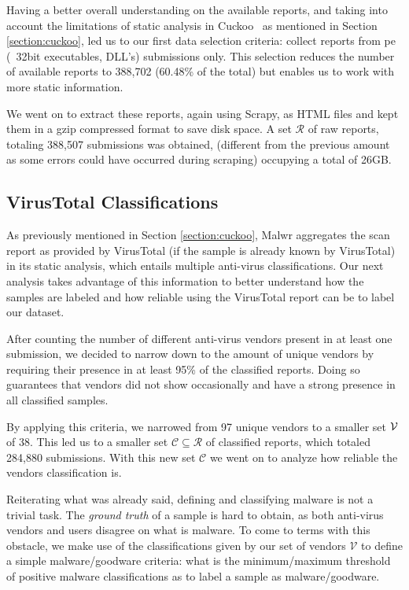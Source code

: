 Having a better overall understanding on the available reports, and taking into account the limitations of static analysis in Cuckoo~\cite{tool:cuckoo} as mentioned in Section \ref{section:cuckoo}, led us to our first data selection criteria: collect reports from \gls{pe} (\eg\ 32bit executables, DLL's) submissions only.
This selection reduces the number of available reports to 388,702 (60.48\% of the total) but enables us to work with more static information.

We went on to extract these reports, again using Scrapy, as HTML files and kept them in a gzip compressed format to save disk space.
A set $\mathcal{R}$ of raw reports, totaling 388,507 submissions was obtained, (different from the
previous amount as some errors could have occurred during scraping) occupying a total of 26GB.

\subsection{VirusTotal Classifications}
\label{subsection:virustotal_classifications}

As previously mentioned in Section \ref{section:cuckoo}, Malwr aggregates the scan report as provided by VirusTotal (if the sample is already known by VirusTotal) in its static analysis, which entails multiple anti-virus classifications.
Our next analysis takes advantage of this information to better understand how the samples are labeled and how reliable using the VirusTotal report can be to label our dataset.

After counting the number of different anti-virus vendors present in at least one submission, we decided to narrow down to the amount of unique vendors by requiring their presence in at least 95\% of the classified reports.
Doing so guarantees that vendors did not show occasionally and have a strong presence in all classified samples.

By applying this criteria, we narrowed from 97 unique vendors to a smaller set $\mathcal{V}$ of 38.
This led us to a smaller set $\mathcal{C}\subseteq\mathcal{R}$ of classified reports, which totaled 284,880 submissions. With this new set $\mathcal{C}$ we went on to analyze how reliable the vendors classification is.

Reiterating what was already said, defining and classifying malware is not a trivial task.
The \textit{ground truth} of a sample is hard to obtain, as both anti-virus vendors and users disagree on what is malware.
To come to terms with this obstacle, we make use of the classifications given by our set of vendors $\mathcal{V}$ to define a simple malware/goodware criteria: what is the minimum/maximum threshold of positive malware classifications as to label a sample as malware/goodware.


